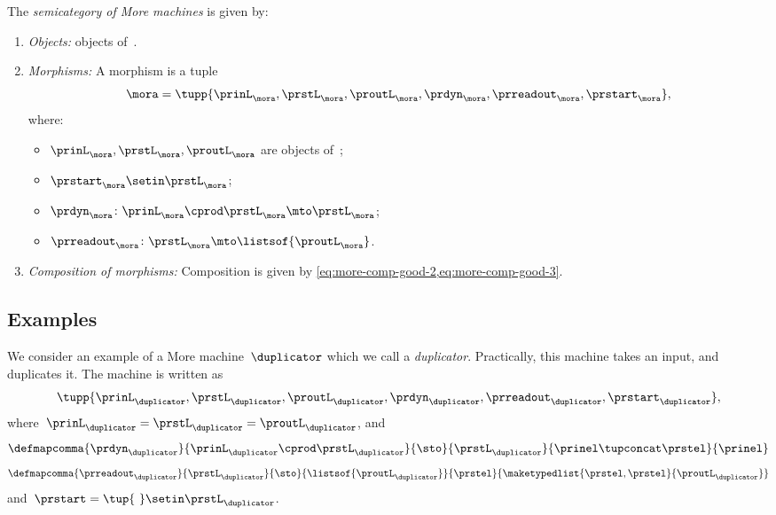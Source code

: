\begin{definition}[\More]
    \label{def:More}
    The \emph{semicategory of More machines} \More is given by:
    \begin{enumerate}
        \item \emph{Objects:} objects of~\SetL.
        \item \emph{Morphisms:}
        A morphism is a tuple
        \begin{equation}
            \mora = \tupp{\prinL_{\mora},\prstL_{\mora}, \proutL_{\mora},\prdyn_{\mora},\prreadout_{\mora},\prstart_{\mora}},
        \end{equation}
        where:
        \begin{itemize}
            \item $\prinL_{\mora},\prstL_{\mora}, \proutL_{\mora}$ are objects of~\SetL;
            \item $\prstart_{\mora} \setin \prstL_{\mora}$;
            \item $ \prdyn_{\mora} \colon \prinL_{\mora} \cprod \prstL_{\mora} \mto \prstL_{\mora}$;
            \item $ \prreadout_{\mora} \colon \prstL_{\mora}  \mto \listsof{\proutL_{\mora}}$.
        \end{itemize}
        \item \emph{Composition of morphisms:}
        Composition is given by \cref{eq:more-comp-good-2,eq:more-comp-good-3}.
    \end{enumerate}
\end{definition}

\subsection{Examples}

\begin{example}[Duplicator]
    We consider an example of a More machine~$\duplicator$ which we call a \emph{duplicator}.
    Practically, this machine takes an input, and duplicates it.
    The machine is written as
    \begin{equation}
        \tupp{\prinL_{\duplicator},\prstL_{\duplicator},\proutL_{\duplicator},\prdyn_{\duplicator},\prreadout_{\duplicator},\prstart_{\duplicator}},
    \end{equation}
    where~$\prinL_{\duplicator}=\prstL_{\duplicator}=\proutL_\duplicator$, and
    \begin{equation}
        \defmapcomma{\prdyn_\duplicator}
        {\prinL_\duplicator \cprod \prstL_\duplicator}
        {\sto}
        {\prstL_\duplicator}
        {\prinel \tupconcat \prstel}
        {\prinel}
    \end{equation}
    \begin{equation}
        \defmapcomma{\prreadout_\duplicator}
        {\prstL_\duplicator}
        {\sto}
        {\listsof{\proutL_\duplicator}}
        {\prstel}
        {\maketypedlist{\prstel,\prstel}{\proutL_\duplicator}}
    \end{equation}
    and~$\prstart=\tup{ \ } \setin \prstL_\duplicator$.
\end{example}

